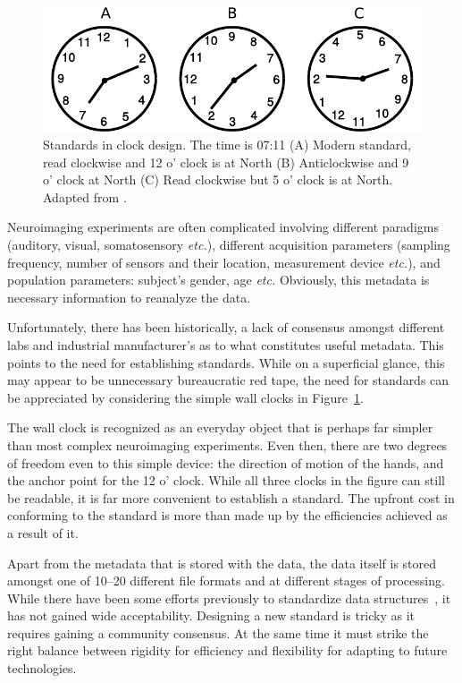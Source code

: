 \begin{figure}[htb]
\begin{center}
   \includegraphics[width=0.7\linewidth]{figures/clock.pdf}
\end{center}
   \caption[Standards in clocks]{Standards in clock design. The time is 07:11 (A) Modern standard, read clockwise and 12 o' clock is at North (B) Anticlockwise and 9 o' clock at North (C) Read clockwise but 5 o' clock is at North. Adapted from \cite{norman2013design}.}
   \label{fig:clock_standards}
\end{figure}
Neuroimaging experiments are often complicated involving different paradigms (auditory, visual, somatosensory \emph{etc.}), different acquisition parameters (sampling frequency, number of sensors and their location, measurement device \emph{etc.}), and population parameters: subject's gender, age \emph{etc.} Obviously, this metadata is necessary information to reanalyze the data.   

Unfortunately, there has been historically, a lack of consensus amongst different labs and industrial manufacturer's as to what constitutes useful metadata. This points to the need for establishing standards. While on a superficial glance, this may appear to be unnecessary bureaucratic red tape, the need for standards can be appreciated by considering the simple wall clocks in Figure~\ref{fig:clock_standards}.

The wall clock is recognized as an everyday object that is perhaps far simpler than most complex neuroimaging experiments. Even then, there are two degrees of freedom even to this simple device: the direction of motion of the hands, and the anchor point for the 12 o' clock. While all three clocks in the figure can still be readable, it is far more convenient to establish a standard. The upfront cost in conforming to the standard is more than made up by the efficiencies achieved as a result of it.

Apart from the metadata that is stored with the data, the data itself is stored amongst one of 10--20 different file formats and at different stages of processing. While there have been some efforts previously to standardize data structures~\citep{gibson2009minimum, grewe2011bottom, stoewer2013singlefile, teeters2015neurodata, bigdely2016preparing}, it has not gained wide acceptability. Designing a new standard is tricky as it requires gaining a community consensus. At the same time it must strike the right balance between rigidity for efficiency and flexibility for adapting to future technologies. 

